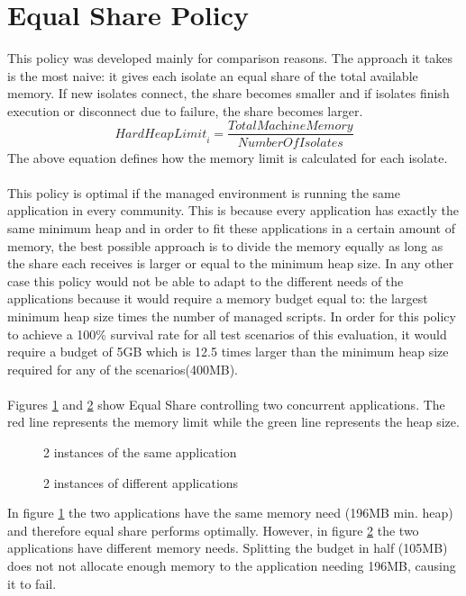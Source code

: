 \documentclass{l4proj}
\begin{document}
\section{Equal Share Policy}
This policy was developed mainly for comparison reasons. The approach it takes is the most naive: it gives each isolate an equal share of the total available memory. If new isolates connect, the share becomes smaller and if isolates finish execution or disconnect due to failure, the share becomes larger.
\begin{equation}
\textit{HardHeapLimit}_i = \dfrac{\textit{TotalMachineMemory}}{\textit{NumberOfIsolates}}
\end{equation}
The above equation defines how the memory limit is calculated for each isolate.
\\\\
This policy is optimal if the managed environment is running the same application in every community. This is because every application has exactly the same minimum heap and in order to fit these applications in a certain amount of memory, the best possible approach is to divide the memory equally as long as the share each receives is larger or equal to the minimum heap size. In any other case this policy would not be able to adapt to the different needs of the applications because it would require a memory budget equal to: the largest minimum heap size times the number of managed scripts. In order for this policy to achieve a 100\% survival rate for all test scenarios of this evaluation, it would require a budget of 5GB which is 12.5 times larger than the minimum heap size required for any of the scenarios(400MB).
\\\\
Figures \ref{equalshare_eq} and \ref{equalshare_df} show Equal Share controlling two concurrent applications. The red line represents the memory limit while the green line represents the heap size.
\newpage
\begin{figure}[!ht]
\caption{2 instances of the same application}
\label{equalshare_eq}
\end{figure}
\begin{figure}[!ht]
\caption{2 instances of different applications}
\label{equalshare_df}
\end{figure}
In figure \ref{equalshare_eq} the two applications have the same memory need (196MB min. heap) and therefore equal share performs optimally. However, in figure \ref{equalshare_df} the two applications have different memory needs. Splitting the budget in half (105MB) does not not allocate enough memory to the application needing 196MB, causing it to fail.
\end{document}
